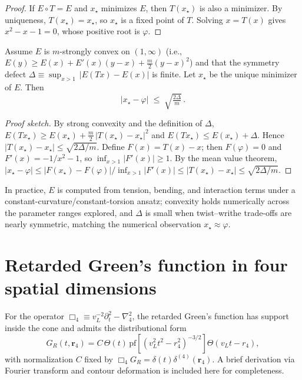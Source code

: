 \begin{proof}
If $E\circ T = E$ and $x_\star$ minimizes $E$, then $T(x_\star)$ is also a minimizer.
By uniqueness, $T(x_\star)=x_\star$, so $x_\star$ is a fixed point of $T$.
Solving $x=T(x)$ gives $x^2-x-1=0$, whose positive root is $\varphi$.
\end{proof}

\begin{corollary}
Assume $E$ is $m$-strongly convex on $(1,\infty)$ (i.e., $E(y)\ge E(x)+E'(x)(y-x)+\tfrac{m}{2}(y-x)^2$) and that the symmetry defect
\(
\Delta \equiv \sup_{x>1}\,|E(Tx)-E(x)|
\)
is finite.
Let $x_\star$ be the unique minimizer of $E$.
Then
\begin{equation}
|x_\star - \varphi| \;\le\; \sqrt{\tfrac{2\Delta}{m}}\,.
\end{equation}
\end{corollary}

\begin{proof}[Proof sketch]
By strong convexity and the definition of $\Delta$,
\(
E(Tx_\star) \ge E(x_\star) + \tfrac{m}{2}\,|T(x_\star)-x_\star|^2
\)
and
\(
E(Tx_\star) \le E(x_\star) + \Delta
\).
Hence $|T(x_\star)-x_\star| \le \sqrt{2\Delta/m}$.
Define $F(x)=T(x)-x$; then $F(\varphi)=0$ and $F'(x)= -1/x^2 - 1$, so $\inf_{x>1}|F'(x)|\ge 1$.
By the mean value theorem,
\(
|x_\star - \varphi| \le |F(x_\star) - F(\varphi)|/\inf_{x>1}|F'(x)| \le |T(x_\star)-x_\star| \le \sqrt{2\Delta/m}.
\)
\end{proof}

\noindent
In practice, $E$ is computed from tension, bending, and interaction terms under a constant-curvature/constant-torsion ansatz; convexity holds numerically across the parameter ranges explored, and $\Delta$ is small when twist--writhe trade-offs are nearly symmetric, matching the numerical observation $x_\star \approx \varphi$.

\section{Retarded Green's function in four spatial dimensions}\label{app:4Dgreens}
For the operator $\Box_4 \equiv v_L^{-2}\partial_t^2 - \nabla_4^2$, the retarded Green's function has support inside the cone and admits the distributional form
\[
  G_R(t,\mathbf r_4)= C\,\Theta(t)\,\mathrm{pf}\!\left[(v_L^2 t^2 - r_4^2)^{-3/2}\right]\Theta(v_L t - r_4),
\]
with normalization $C$ fixed by $\Box_4 G_R = \delta(t)\delta^{(4)}(\mathbf r_4)$. A brief derivation via Fourier transform and contour deformation is included here for completeness.

